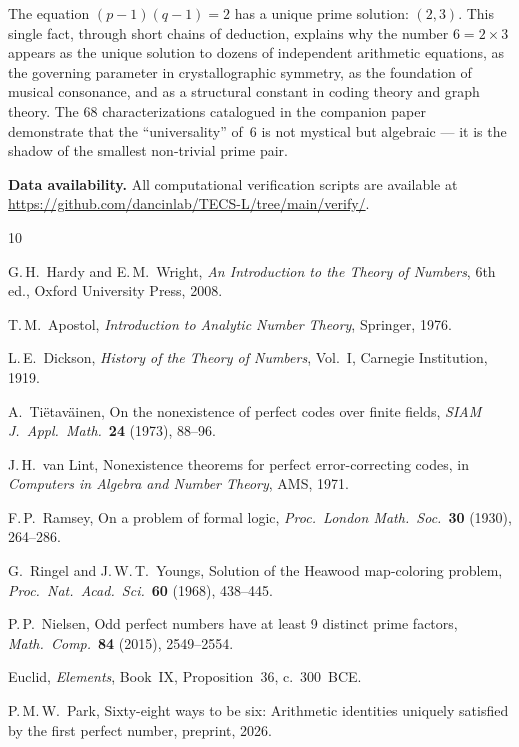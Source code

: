 \documentclass{amsart}
\begin{document}
The equation $(p-1)(q-1) = 2$ has a unique prime solution: $(2, 3)$. This single fact, through short chains of deduction, explains why the number $6 = 2 \times 3$ appears as the unique solution to dozens of independent arithmetic equations, as the governing parameter in crystallographic symmetry, as the foundation of musical consonance, and as a structural constant in coding theory and graph theory. The 68 characterizations catalogued in the companion paper~\cite{68ways} demonstrate that the ``universality'' of~6 is not mystical but algebraic --- it is the shadow of the smallest non-trivial prime pair.

\bigskip
\noindent\textbf{Data availability.} All computational verification scripts are available at \url{https://github.com/dancinlab/TECS-L/tree/main/verify/}.

\begin{thebibliography}{10}

G.\,H.~Hardy and E.\,M.~Wright, \emph{An Introduction to the Theory of Numbers}, 6th ed., Oxford University Press, 2008.

T.\,M.~Apostol, \emph{Introduction to Analytic Number Theory}, Springer, 1976.

L.\,E.~Dickson, \emph{History of the Theory of Numbers}, Vol.~I, Carnegie Institution, 1919.

A.~Ti\"etav\"ainen, On the nonexistence of perfect codes over finite fields, \emph{SIAM J.\ Appl.\ Math.}\ \textbf{24} (1973), 88--96.

J.\,H.~van Lint, Nonexistence theorems for perfect error-correcting codes, in \emph{Computers in Algebra and Number Theory}, AMS, 1971.

F.\,P.~Ramsey, On a problem of formal logic, \emph{Proc.\ London Math.\ Soc.}\ \textbf{30} (1930), 264--286.

G.~Ringel and J.\,W.\,T.~Youngs, Solution of the Heawood map-coloring problem, \emph{Proc.\ Nat.\ Acad.\ Sci.}\ \textbf{60} (1968), 438--445.

P.\,P.~Nielsen, Odd perfect numbers have at least 9 distinct prime factors, \emph{Math.\ Comp.}\ \textbf{84} (2015), 2549--2554.

Euclid, \emph{Elements}, Book~IX, Proposition~36, c.~300~BCE.

P.\,M.\,W.~Park, Sixty-eight ways to be six: Arithmetic identities uniquely satisfied by the first perfect number, preprint, 2026.

\end{thebibliography}
\end{document}
